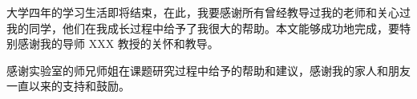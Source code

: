 
大学四年的学习生活即将结束，在此，我要感谢所有曾经教导过我的老师和关心过我的同学，他们在我成长过程中给予了我很大的帮助。本文能够成功地完成，要特别感谢我的导师 XXX 教授的关怀和教导。

感谢实验室的师兄师姐在课题研究过程中给予的帮助和建议，感谢我的家人和朋友一直以来的支持和鼓励。
